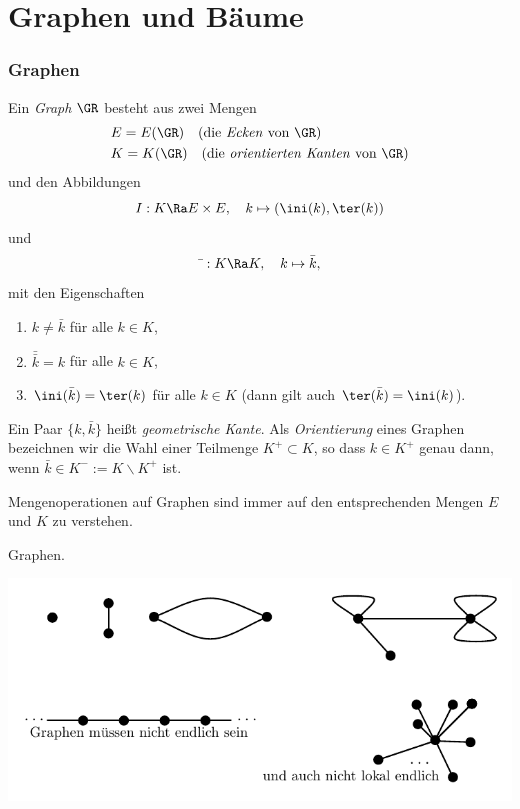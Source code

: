 \part{Graphen und Bäume}

\section{Graphen}\label{sec_graphen}

\DEF Ein \emph{Graph} $\GR$ besteht aus zwei Mengen
\begin{align*}
& E=E(\GR) \quad \text{(die \emph{Ecken}\index{Ecke} von $\GR$)} \\
& K=K(\GR) \quad \text{(die \emph{orientierten Kanten}\index{Kante}\index{orientierte Kanten}\index{Kante!orientiert} von $\GR$)}\index{$\GR$}\index{$E(\GR)$}\index{$K(\GR)$}\index{$\ini(k)$, $\ter(k)$}
\end{align*}
und den Abbildungen
\[
I : K \Ra E\times E,\quad k \mapsto (\ini(k),\ter(k))
\]
und
\[
\bar{\ }:K\Ra K,\quad k\mapsto\bar{k},
\]
mit den Eigenschaften
\begin{enumerate}
\item $k\neq \bar{k}$ für alle $k\in K$,
\item $\bar{\bar{k}}=k$ für alle $k\in K$,
\item $\ini(\bar{k})=\ter(k)$ für alle $k\in K$ (dann gilt auch $\ter(\bar{k})=\ini(k)$).
\end{enumerate}
Ein Paar $\{k,\bar{k}\}$ heißt \emph{geometrische Kante}.
Als \emph{Orientierung} eines Graphen bezeichnen
wir die Wahl einer Teilmenge $K^+ \subset K$, so dass
$k\in K^+$ genau dann, wenn
$\bar{k}\in K^- := K\backslash K^+$ ist.

Mengenoperationen auf Graphen sind immer auf den entsprechenden
Mengen $E$ und $K$ zu verstehen.

\BSP Graphen.
\begin{center}
	\includegraphics{grugraImages/bspgraphen}
\end{center}

